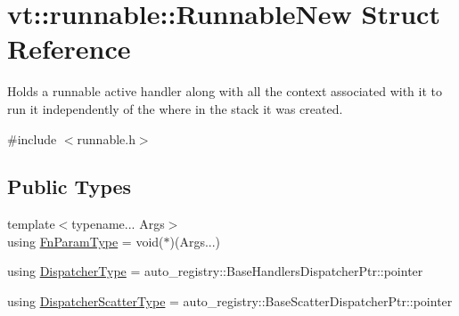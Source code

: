\hypertarget{structvt_1_1runnable_1_1_runnable_new}{}\section{vt\+:\+:runnable\+:\+:Runnable\+New Struct Reference}
\label{structvt_1_1runnable_1_1_runnable_new}


Holds a runnable active handler along with all the context associated with it to run it independently of the where in the stack it was created.  




{\ttfamily \#include $<$runnable.\+h$>$}

\subsection*{Public Types}
\begin{DoxyCompactItemize}
\item 
{\footnotesize template$<$typename... Args$>$ }\\using \hyperlink{structvt_1_1runnable_1_1_runnable_new_a591a5eaee30eea99711e14e050633d34}{Fn\+Param\+Type} = void($\ast$)(Args...)
\item 
using \hyperlink{structvt_1_1runnable_1_1_runnable_new_ad0cb55d8e34960ef9dd139638cb721cd}{Dispatcher\+Type} = auto\+\_\+registry\+::\+Base\+Handlers\+Dispatcher\+Ptr\+::pointer
\item 
using \hyperlink{structvt_1_1runnable_1_1_runnable_new_a1e5173d3a71a30f4901c61b7de4092c6}{Dispatcher\+Scatter\+Type} = auto\+\_\+registry\+::\+Base\+Scatter\+Dispatcher\+Ptr\+::pointer
\end{DoxyCompactItemize}
